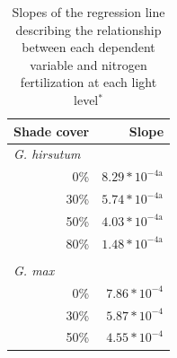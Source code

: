 \newpage
\begin{landscape}
    \begin{table}
        \caption[Slopes of the regression line describing the relationship between each dependent variable and nitrogen fertilization at each light level]{Slopes of the regression line describing the relationship between each dependent variable and nitrogen fertilization at each light level$^*$}
        \label{table:tab.a3}
        \centering
            \begin{tabular}{p{0.5cm}p{2cm}p{3cm}}
            \hline
            \multicolumn{2}{r}{Shade cover} 
            & \multicolumn{1}{r}{Slope}
            \\
            \hline
             
            \multicolumn{2}{l}{\textit{G. hirsutum}} & \\
            & \multicolumn{1}{r}{0\%}
            &  \multicolumn{1}{r}{\textbf{$8.29*10^{-4\mathrm{a}}$}}
            \\
            & \multicolumn{1}{r}{30\%}                     
            &  \multicolumn{1}{r}{\textbf{$5.74*10^{-4\mathrm{a}}$}}
            \\
            & \multicolumn{1}{r}{50\%}
            &  \multicolumn{1}{r}{\textbf{$4.03*10^{-4\mathrm{a}}$}}
            \\
            & \multicolumn{1}{r}{80\%}
            &  \multicolumn{1}{r}{$1.48*10^{-4\mathrm{a}}$}
            \\
            && 
            \\

            \multicolumn{2}{l}{\textit{G. max}} &
            \\
            & \multicolumn{1}{r}{0\%}
            &  \multicolumn{1}{r}{\textbf{$7.86*10^{-4}$}}
            \\
              
            & \multicolumn{1}{r}{30\%}
            &  \multicolumn{1}{r}{\textbf{$5.87*10^{-4}$}}
            \\
              
            & \multicolumn{1}{r}{50\%}
            &  \multicolumn{1}{r}{\textbf{$4.55*10^{-4}$}}
            \\
              

\end{tabular}
\end{table}
\end{landscape}
